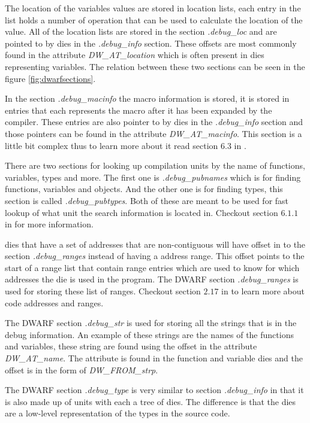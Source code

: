 The location of the variables values are stored in location lists, each entry in the list holds a number of operation that can be used to calculate the location of the value.
All of the location lists are stored in the section \emph{.debug\_loc} and are pointed to by \glspl{die} in the \emph{.debug\_info} section.
These offsets are most commonly found in the attribute \emph{DW\_AT\_location} which is often present in \glspl{die} representing variables.
The relation between these two sections can be seen in the figure \ref{fig:dwarfsections}.


In the section \emph{.debug\_macinfo} the macro information is stored, it is stored in entries that each represents the macro after it has been expanded by the compiler.
These entries are also pointer to by \glspl{die} in the \emph{.debug\_info} section and those pointers can be found in the attribute \emph{DW\_AT\_macinfo}.
This section is a little bit complex thus to learn more about it read section $6.3$ in \cite{dwarf}.


There are two sections for looking up compilation units by the name of functions, variables, types and more.
The first one is \emph{.debug\_pubnames} which is for finding functions, variables and objects.
And the other one is for finding types, this section is called \emph{.debug\_pubtypes}.
Both of these are meant to be used for fast lookup of what unit the search information is located in.
Checkout section $6.1.1$ in \cite{dwarf} for more information.


\Glspl{die} that have a set of addresses that are non-contiguous will have offset in to the section \emph{.debug\_ranges} instead of having a address range.
This offset points to the start of a range list that contain range entries which are used to know for which addresses the \gls{die} is used in the program.
The \gls{DWARF} section \emph{.debug\_ranges} is used for storing these list of ranges.
Checkout section $2.17$ in \cite{dwarf} to learn more about code addresses and ranges.


The \gls{DWARF} section \emph{.debug\_str} is used for storing all the strings that is in the debug information.
An example of these strings are the names of the functions and variables, these string are found using the offset in the attribute \emph{DW\_AT\_name}.
The attribute is found in the function and variable \glspl{die} and the offset is in the form of \emph{DW\_FROM\_strp}.


The \gls{DWARF} section \emph{.debug\_type} is very similar to section \emph{.debug\_info} in that it is also made up of units with each a tree of \glspl{die}.
The difference is that the \glspl{die} are a low-level representation of the types in the source code.

